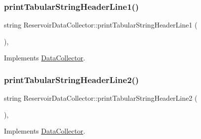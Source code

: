 \mbox{\label{classReservoirDataCollector_a62e7c7abc34c8154b338dfbd284ed665_a62e7c7abc34c8154b338dfbd284ed665}} 
\subsubsection{\texorpdfstring{print\+Tabular\+String\+Header\+Line1()}{printTabularStringHeaderLine1()}}
{\footnotesize\ttfamily string Reservoir\+Data\+Collector\+::print\+Tabular\+String\+Header\+Line1 (\begin{DoxyParamCaption}{ }\end{DoxyParamCaption})\hspace{0.3cm}{\ttfamily [override]}, {\ttfamily [virtual]}}



Implements \mbox{\hyperlink{classDataCollector_a91619cfa9e9b8cefd2f7c20d5718b41e_a91619cfa9e9b8cefd2f7c20d5718b41e}{Data\+Collector}}.

\mbox{\label{classReservoirDataCollector_ae2f8e808c5960608e510a64c7f00ad1b_ae2f8e808c5960608e510a64c7f00ad1b}} 
\subsubsection{\texorpdfstring{print\+Tabular\+String\+Header\+Line2()}{printTabularStringHeaderLine2()}}
{\footnotesize\ttfamily string Reservoir\+Data\+Collector\+::print\+Tabular\+String\+Header\+Line2 (\begin{DoxyParamCaption}{ }\end{DoxyParamCaption})\hspace{0.3cm}{\ttfamily [override]}, {\ttfamily [virtual]}}



Implements \mbox{\hyperlink{classDataCollector_af01ea961314be2164f39e6d4cd59e443_af01ea961314be2164f39e6d4cd59e443}{Data\+Collector}}.



